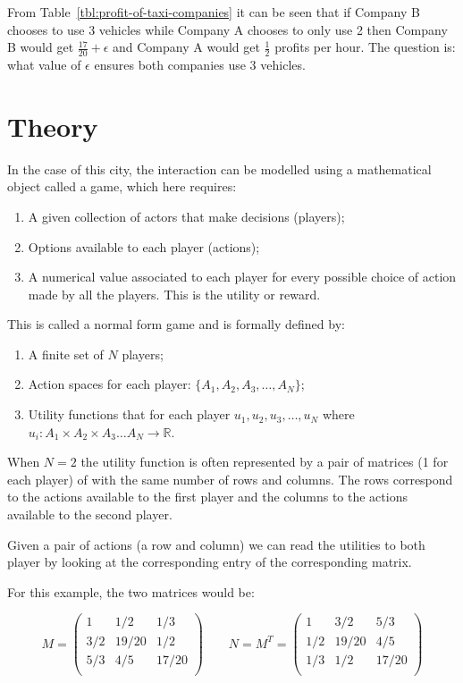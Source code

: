 From Table~\ref{tbl:profit-of-taxi-companies} it can be seen that if Company B
chooses to use 3 vehicles while Company A chooses to only use 2 then Company B
would get \(\frac{17}{20} + \epsilon\) and Company A would get \(\frac{1}{2}\)
profits per hour. The question is: what value of \(\epsilon\) ensures both
companies use 3 vehicles.

\section{Theory}\label{sec:theory}

In the case of this city, the interaction can be modelled using a mathematical
object called a game, which here requires:

\begin{enumerate}
    \item A given collection of actors that make decisions (players);
    \item Options available to each player (actions);
    \item A numerical value associated to each player for every possible
        choice of action made by all the players. This is the utility or reward.
\end{enumerate}

This is called a normal form game and is formally defined by:

\begin{enumerate}
    \item A finite set of \(N\) players;
    \item Action spaces for each player: \(\{A_1, A_2, A_3, \dots, A_N\}\);
    \item Utility functions that for each player \(u_1, u_2, u_3, \dots, u_N\)
        where \(u_i:A_1\times A_2 \times A_3 \dots A_N \to \mathbb{R}\).
\end{enumerate}

When \(N=2\) the utility function is often represented by a pair of matrices (1
for each player) of with the same number of rows and columns. The rows
correspond to the actions available to the first player and the columns to the
actions available to the second player.

Given a pair of actions (a row and column) we can read the utilities to both
player by looking at the corresponding entry of the corresponding matrix.

For this example, the two matrices would be:

\[
   M =
        \begin{pmatrix}
            1     & 1 / 2   & 1 / 3 \\
            3 / 2 & 19 / 20 & 1 / 2 \\
            5 / 3 & 4 / 5   & 17 / 20\\
        \end{pmatrix}
   \qquad
   N = M ^T =
        \begin{pmatrix}
            1     & 3 / 2   & 5 / 3 \\
            1 / 2 & 19 / 20 & 4 / 5 \\
            1 / 3 & 1 / 2   & 17 / 20\\
        \end{pmatrix}
\]

